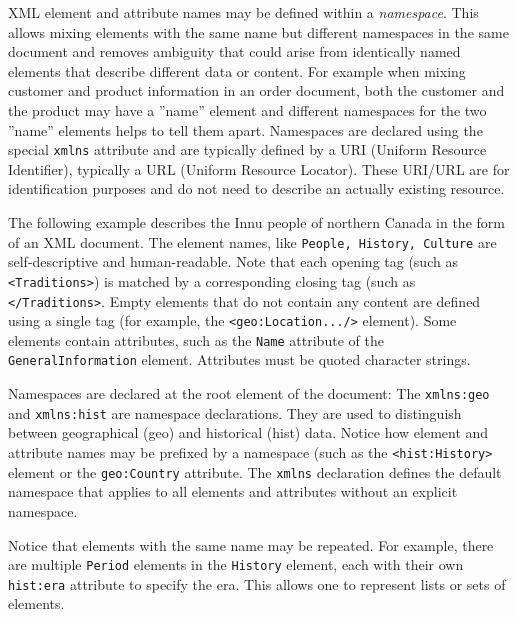 XML element and attribute names may be defined within a \emph{namespace}. This allows mixing elements with the same name but different namespaces in the same document and removes ambiguity that could arise from identically named elements that describe different data or content. For example when mixing customer and product information in an order document, both the customer and the product may have a ''name'' element and different namespaces for the two ''name'' elements helps to tell them apart. Namespaces are declared using the special \texttt{xmlns} attribute and are typically defined by a URI (Uniform Resource Identifier), typically a URL (Uniform Resource Locator). These URI/URL are for identification purposes and do not need to describe an actually existing resource.

The following example describes the Innu people of northern Canada in the form of an XML document. The element names, like \texttt{People, History, Culture} are self-descriptive and human-readable. Note that each opening tag (such as \texttt{<Traditions>}) is matched by a corresponding closing tag (such as \texttt{</Traditions>}. Empty elements that do not contain any content are defined using a single tag (for example, the \texttt{<geo:Location.../>} element). Some elements contain attributes, such as the \texttt{Name} attribute of the \texttt{GeneralInformation} element. Attributes must be quoted character strings.

Namespaces are declared at the root element of the document: The \texttt{xmlns:geo} and \texttt{xmlns:hist} are namespace declarations. They are used to distinguish between geographical (geo) and historical (hist) data. Notice how element and attribute names may be prefixed by a namespace (such as the \texttt{<hist:History>} element or the \texttt{geo:Country} attribute. The \texttt{xmlns} declaration defines the default namespace that applies to all elements and attributes without an explicit namespace.

Notice that elements with the same name may be repeated. For example, there are multiple \texttt{Period} elements in the \texttt{History} element, each with their own \texttt{hist:era} attribute to specify the era. This allows one to represent lists or sets of elements. 

